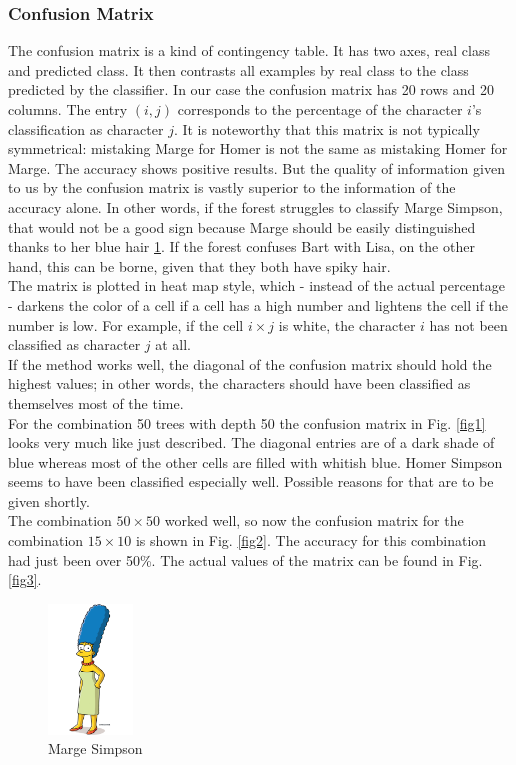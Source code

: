 \documentclass[journal, a4paper]{IEEEtran}
\begin{document}
\subsubsection{Confusion Matrix}
The confusion matrix is a kind of contingency table. It has two axes, real class and predicted class. It then contrasts all examples by real class to the class predicted by the classifier. 
In our case the confusion matrix has 20 rows and 20 columns. The entry \( (i,j) \) corresponds to the percentage of the character \( i \)'s classification as character \( j \). It is noteworthy that this matrix is not typically symmetrical: mistaking Marge for Homer is not the same as mistaking Homer for Marge.\newline
The accuracy shows positive results. But the quality of information given to us by the confusion matrix is vastly superior to the information of the accuracy alone. In other words, if the forest struggles to classify Marge Simpson, that would not be a good sign because Marge should be easily distinguished thanks to her blue hair \ref{fig6}. If the forest confuses Bart with Lisa, on the other hand, this can be borne, given that they both have spiky hair. 
\\
The matrix is plotted in heat map style, which - instead of the actual percentage - darkens the color of a cell if a cell has a high number and lightens the cell if the number is low. For example, if the cell \( i \times j \)  is white, the character \( i \) has not been classified as character \( j \) at all. 
\\
If the method works well, the diagonal of the confusion matrix should hold the highest values; in other words, the characters should have been classified as themselves most of the time. 
\\
For the combination 50 trees with depth 50 the confusion matrix in Fig. \ref{fig1} looks very much like just described. The diagonal entries are of a dark shade of blue whereas most of the other cells are filled with whitish blue. Homer Simpson seems to have been classified especially well. Possible reasons for that are to be given shortly.
\\
The combination \( 50 \times 50 \) worked well, so now the confusion matrix for the combination \( 15 \times 10 \) is shown in Fig. \ref{fig2}. The accuracy for this combination had just been over 50\%. The actual values of the matrix can be found in Fig. \ref{fig3}.
\\
\begin{figure}[!ht]
	\centering
  \includegraphics[width=0.2\textwidth]{MargeSimpson.png}
	\caption{Marge Simpson}
	\label{fig6}
\end{figure}
\end{document}
